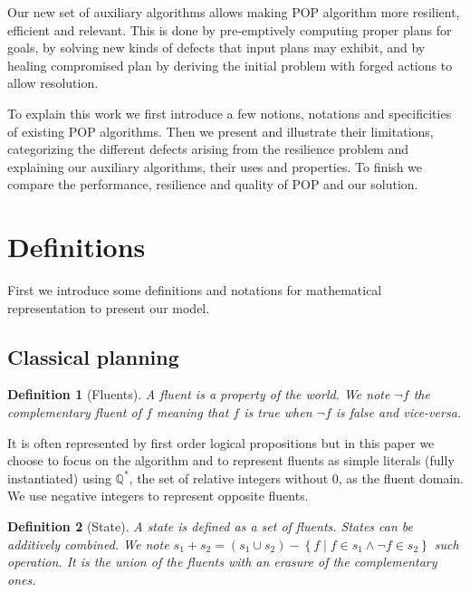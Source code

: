 \documentclass[]{article}
\newtheorem{definition}{Definition}
\begin{document}
Our new set of auxiliary algorithms allows making POP algorithm more
resilient, efficient and relevant. This is done by pre-emptively
computing proper plans for goals, by solving new kinds of defects that
input plans may exhibit, and by healing compromised plan by deriving the
initial problem with forged actions to allow resolution.

To explain this work we first introduce a few notions, notations and
specificities of existing POP algorithms. Then we present and illustrate
their limitations, categorizing the different defects arising from the
resilience problem and explaining our auxiliary algorithms, their uses
and properties. To finish we compare the performance, resilience and
quality of POP and our solution.

\section{Definitions}\label{definitions}

First we introduce some definitions and notations for mathematical
representation to present our model.

\subsection{Classical planning}\label{classical-planning}

\begin{definition}[Fluents]

A fluent is a property of the world. We note \(\lnot f\) the
complementary fluent of \(f\) meaning that \(f\) is true when
\(\lnot f\) is false and vice-versa.

\end{definition}

It is often represented by first order logical propositions but in this
paper we choose to focus on the algorithm and to represent fluents as
simple literals (fully instantiated) using \(\mathbb{Q}^*\), the set of
relative integers without \(0\), as the fluent domain. We use negative
integers to represent opposite fluents.

\begin{definition}[State]

A state is defined as a set of fluents. States can be additively
combined. We note
\(s_1 + s_2 = \left( s_1 \cup s_2 \right) - \left\{ f \middle| f \in s_1 \land \lnot f \in s_2 \right\}\)
such operation. It is the union of the fluents with an erasure of the
complementary ones.

\end{definition}
\end{document}
